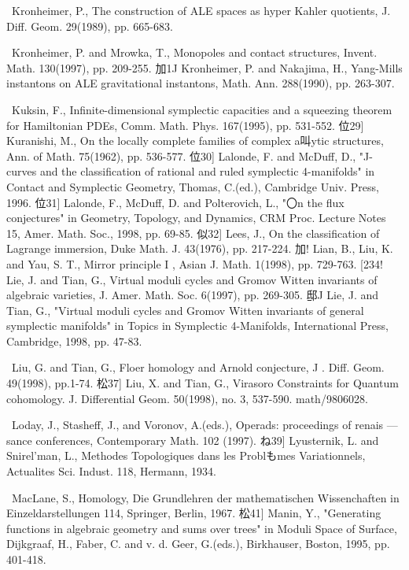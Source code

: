 {\noindent [225]\ Kronheimer, P., The construction of ALE spaces as hyper Kahler quotients, J. Diff. Geom. 29(1989), pp. 665-683.\par\smallskip
\noindent [226]\ Kronheimer, P. and Mrowka, T., Monopoles and contact structures, Invent. Math. 130(1997), pp. 209-255. 加1J Kronheimer, P. and Nakajima, H., Yang-Mills instantons on ALE gravitational instantons, Math. Ann. 288(1990), pp. 263-307.\par\smallskip
\noindent [228]\ Kuksin, F., Infinite-dimensional symplectic capacities and a squeezing theorem for Hamiltonian PDEs, Comm. Math. Phys. 167(1995), pp. 531-552. 位29] Kuranishi, M., On the locally complete families of complex a叫ytic structures, Ann. of Math. 75(1962), pp. 536-577. 位30] Lalonde, F. and McDuff, D., "J-curves and the classification of rational and ruled symplectic 4-manifolds" in Contact and Symplectic Geometry, Thomas, C.(ed.), Cambridge Univ. Press, 1996. 位31] Lalonde, F., McDuff, D. and Polterovich, L., "〇n the flux conjectures" in Geometry, Topology, and Dynamics, CRM Proc. Lecture Notes 15, Amer. Math. Soc., 1998, pp. 69-85. 似32] Lees, J., On the classification of Lagrange immersion, Duke Math. J. 43(1976), pp. 217-224. 加! Lian, B., Liu, K. and Yau, S. T., Mirror principle I , Asian J. Math. 1(1998), pp. 729-763. [234! Lie, J. and Tian, G., Virtual moduli cycles and Gromov Witten invariants of algebraic varieties, J. Amer. Math. Soc. 6(1997), pp. 269-305. 邸J Lie, J. and Tian, G., "Virtual moduli cycles and Gromov Witten invariants of general symplectic manifolds" in Topics in Symplectic 4-Manifolds, International Press, Cambridge, 1998, pp. 47-83.\par\smallskip
\noindent [236]\ Liu, G. and Tian, G., Floer homology and Arnold conjecture, J . Diff. Geom. 49(1998), pp.1-74. 松37] Liu, X. and Tian, G., Virasoro Constraints for Quantum cohomology. J. Differential Geom. 50(1998), no. 3, 537-590. math/9806028.\par\smallskip
\noindent [238]\ Loday, J., Stasheff, J., and Voronov, A.(eds.), Operads: proceedings of renais — sance conferences, Contemporary Math. 102 (1997). ね39] Lyusternik, L. and Snirel'man, L., Methodes Topologiques dans les Problもmes Variationnels, Actualites Sci. Indust. 118, Hermann, 1934.\par\smallskip
\noindent [240]\ MacLane, S., Homology, Die Grundlehren der mathematischen Wissenchaften in Einzeldarstellungen 114, Springer, Berlin, 1967. 松41] Manin, Y., "Generating functions in algebraic geometry and sums over trees" in Moduli Space of Surface, Dijkgraaf, H., Faber, C. and v. d. Geer, G.(eds.), Birkhauser, Boston, 1995, pp. 401-418.\par\smallskip
}
